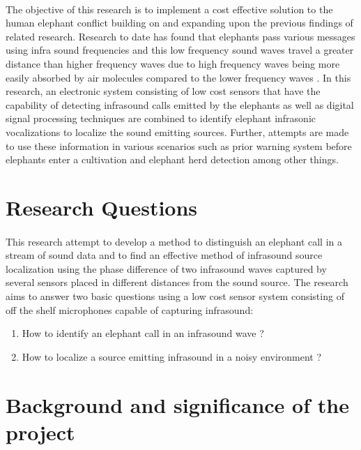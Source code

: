 \documentclass[11pt]{article}
\numberwithin{figure}{section}
\numberwithin{table}{section}
\begin{document}
\paragraph{}
The objective of this research is to implement  a cost effective solution to the human elephant conflict building on and expanding upon the previous findings of related research. Research to date has found that elephants pass various messages using infra sound frequencies and this low frequency sound waves travel a greater distance than higher frequency waves  due to high frequency waves being more easily absorbed by air molecules compared to the lower frequency waves \cite {5}. In this research, an electronic system consisting of low cost sensors that have the capability of detecting infrasound calls emitted by the elephants as well as digital signal processing techniques are combined to  identify elephant  infrasonic vocalizations to localize the sound emitting sources. Further, attempts are made to use these information in various scenarios such as prior warning system before elephants enter a cultivation and elephant herd detection among other things.

\section{Research Questions }
\paragraph{}
This research attempt to develop a method to distinguish an elephant call in a stream of sound data and to find an effective method of infrasound source localization using the phase difference of two infrasound waves captured by several sensors placed in different distances from the sound source. The research aims to answer two basic questions using a low cost sensor system consisting of off the shelf microphones capable of capturing infrasound:

\begin{enumerate}
\item How to identify an elephant call in an infrasound wave ? 
\item How to  localize a source emitting infrasound in a noisy environment ?
\end{enumerate}

\newpage
\section{Background and significance of the project}
\end{document}
